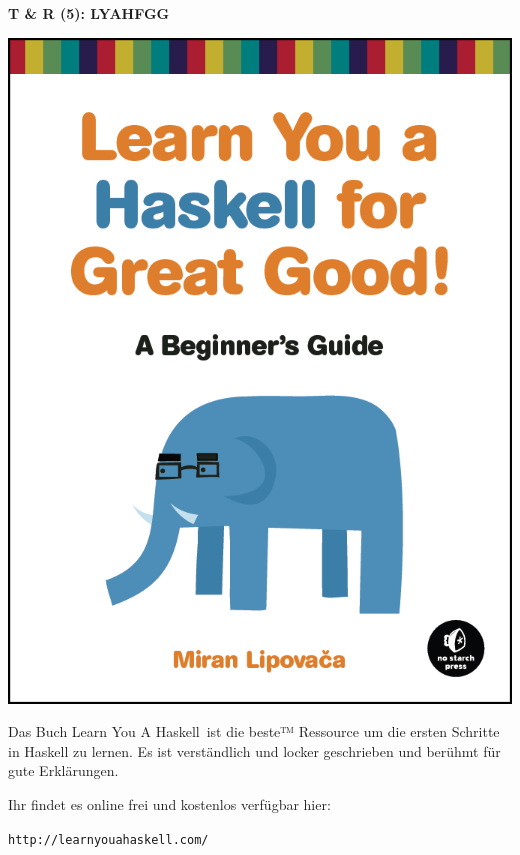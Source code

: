\documentclass[unknownkeysallowed]{beamer}
\begin{document}
  \begin{frame}
    \begin{center}
    \Large\textbf{T \& R (5): LYAHFGG}\\ \bigskip \normalsize
    \begin{multicols}{2}
    
	\includegraphics[scale=0.15]{lyah.png} 
	
	\columnbreak    
    Das Buch \glqq Learn You A Haskell\grqq\ ist die beste™ Ressource um die ersten Schritte in Haskell zu 
    lernen. Es ist verständlich und locker geschrieben und berühmt für gute Erklärungen.\bigskip
   
    Ihr findet es online frei und kostenlos verfügbar hier:
    
    \texttt{http://learnyouahaskell.com/}
    \end{multicols}
    \end{center}
  \end{frame}
  
\end{document}
